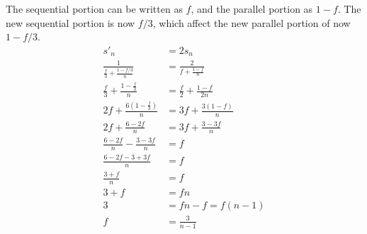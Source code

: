 \documentclass{article}
\begin{document}
The sequential portion can be written as $f$, and the parallel portion as $1-f$. The new sequential portion is now $f/3$, which affect the new parallel portion of now $1-f/3$. 
\begin{align*}
s'_n &= 2s_n \\
\frac{1}{\frac{f}{3} + \frac{1-f/3}{n}} &= \frac{2}{f + \frac{1-f}{n}} \\
\frac{f}{3} + \frac{1-\frac{f}{3}}{n} &= \frac{f}{2} + \frac{1-f}{2n} \\
2f + \frac{6(1-\frac{f}{3})}{n} &= 3f + \frac{3(1-f)}{n} \\
2f + \frac{6-2f}{n} &= 3f + \frac{3-3f}{n} \\
\frac{6-2f}{n} - \frac{3-3f}{n} &= f \\
\frac{6-2f-3+3f}{n} &= f \\
\frac{3+f}{n} &= f \\
3+f &= fn \\
3 &= fn - f = f(n-1) \\
f &= \frac{3}{n-1} \\
\end{align*}
\end{document}
